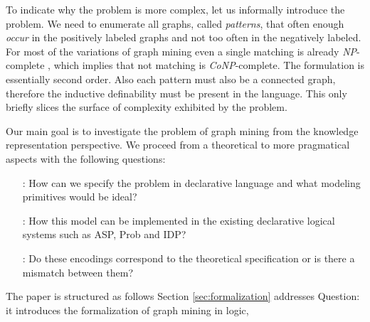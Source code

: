 To indicate why the problem is more complex, let us informally introduce the problem. We need to enumerate all graphs, called \textit{patterns}, that often enough \textit{occur} in the positively labeled graphs and not too often in the negatively labeled. For most of the variations of graph mining even a single matching is already \textit{NP}-complete \citep{subtree_overview}, which implies that not matching is \textit{CoNP}-complete. The formulation is essentially second order. Also each pattern must also be a connected graph, therefore the inductive definability must be present in the language.  This only briefly slices the surface of complexity exhibited by the problem.

Our main goal is to investigate the problem of graph mining from the knowledge representation perspective. We proceed from a theoretical to more pragmatical aspects with the following questions:
\begin{itemize}
  \item[\Qone:]  How can we specify the problem in declarative language and what modeling primitives would be ideal?
  \item[\Qtwo:]  How this model can be implemented in the existing declarative logical systems such as ASP, Prob and IDP?
  \item[\Qthree:] Do these encodings correspond to the theoretical specification or is there a mismatch between them?
\end{itemize}

The paper is structured as follows Section \ref{sec:formalization} addresses Question: it introduces the formalization of graph mining in logic, 

